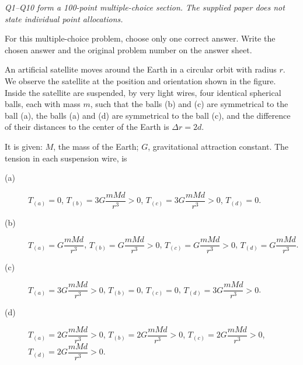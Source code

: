 \textit{Q1--Q10 form a 100-point multiple-choice section. The supplied paper
does not state individual point allocations.}

For this multiple-choice problem, choose only one correct answer. Write the
chosen answer and the original problem number on the answer sheet.

An artificial satellite moves around the Earth in a circular orbit with
radius $r$. We observe the satellite at the position and orientation shown
in the figure. Inside the satellite are suspended, by very light wires,
four identical spherical balls, each with mass $m$, such that the balls
(b) and (c) are symmetrical to the ball (a), the balls (a) and (d) are
symmetrical to the ball (c), and the difference of their distances to the
center of the Earth is $\Delta r=2d$.

It is given: $M$, the mass of the Earth; $G$, gravitational attraction constant.
The tension in each suspension wire, is
\begin{description}
\item[(a)] $T_{(a)}=0$, $T_{(b)}=3G\dfrac{mMd}{r^3}>0$,
  $T_{(c)}=3G\dfrac{mMd}{r^3}>0$, $T_{(d)}=0$.
\item[(b)] $T_{(a)}=G\dfrac{mMd}{r^3}$,
  $T_{(b)}=G\dfrac{mMd}{r^3}>0$,
  $T_{(c)}=G\dfrac{mMd}{r^3}>0$, $T_{(d)}=G\dfrac{mMd}{r^3}$.
\item[(c)] $T_{(a)}=3G\dfrac{mMd}{r^3}>0$, $T_{(b)}=0$, $T_{(c)}=0$,
  $T_{(d)}=3G\dfrac{mMd}{r^3}>0$.
\item[(d)] $T_{(a)}=2G\dfrac{mMd}{r^3}>0$,
  $T_{(b)}=2G\dfrac{mMd}{r^3}>0$,
  $T_{(c)}=2G\dfrac{mMd}{r^3}>0$,
  $T_{(d)}=2G\dfrac{mMd}{r^3}>0$.
\end{description}
